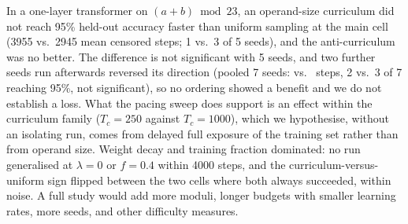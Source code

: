 In a one-layer transformer on $(a+b)\bmod 23$, an operand-size curriculum did not reach 95\% held-out accuracy faster than uniform sampling at the main cell (3955 vs.\ 2945 mean censored steps; 1 vs.\ 3 of 5 seeds), and the anti-curriculum was no better. The difference is not significant with 5 seeds, and two further seeds run afterwards reversed its direction (pooled 7 seeds:  vs.\  steps, 2 vs.\ 3 of 7 reaching 95\%, not significant), so no ordering showed a benefit and we do not establish a loss. What the pacing sweep does support is an effect within the curriculum family ($T_c=250$ against $T_c=1000$), which we hypothesise, without an isolating run, comes from delayed full exposure of the training set rather than from operand size. Weight decay and training fraction dominated: no run generalised at $\lambda=0$ or $f=0.4$ within 4000 steps, and the curriculum-versus-uniform sign flipped between the two cells where both always succeeded, within noise. A full study would add more moduli, longer budgets with smaller learning rates, more seeds, and other difficulty measures.
